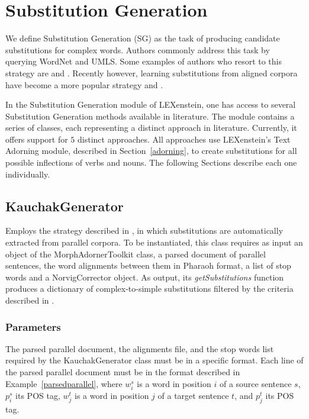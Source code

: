 \section{Substitution Generation}
\label{sg}

We define Substitution Generation (SG) as the task of producing candidate substitutions for complex words. Authors commonly address this task by querying WordNet \cite{wordnet} and UMLS\cite{Bodenreider04}. Some examples of authors who resort to this strategy are \cite{Devlin1998} and \cite{Carroll99}. Recently however, learning substitutions from aligned corpora have become a more popular strategy \cite{Paetzold2013} and \cite{Horn2014}.

In the Substitution Generation module of LEXenstein, one has access to several Substitution Generation methods available in literature. The module contains a series of classes, each representing a distinct approach in literature. Currently, it offers support for $5$ distinct approaches. All approaches use LEXenstein's Text Adorning module, described in Section~\ref{adorning}, to create substitutions for all possible inflections of verbs and nouns. The following Sections describe each one individually.





\subsection{KauchakGenerator}

Employs the strategy described in \cite{Horn2014}, in which substitutions are automatically extracted from parallel corpora. To be instantiated, this class requires as input an object of the MorphAdornerToolkit class, a parsed document of parallel sentences, the word alignments between them in Pharaoh format, a list of stop words and a NorvigCorrector object. As output, its \textit{getSubstitutions} function produces a dictionary of complex-to-simple substitutions filtered by the criteria described in \cite{Horn2014}.

\subsubsection{Parameters}

The parsed parallel document, the alignments file, and the stop words list required by the KauchakGenerator class must be in a specific format. Each line of the parsed parallel document must be in the format described in Example~\ref{parsedparallel}, where $w_{i}^{s}$ is a word in position $i$ of a source sentence $s$, $p_{i}^{s}$ its POS tag, $w_{j}^{t}$ is a word in position $j$ of a target sentence $t$, and $p_{j}^{t}$ its POS tag.

